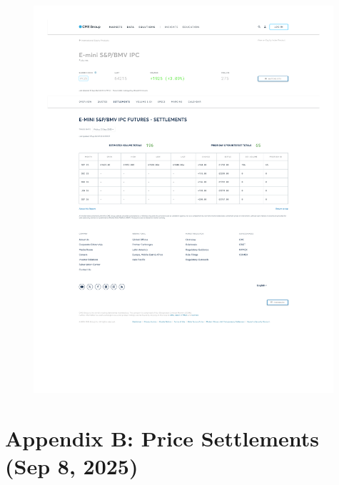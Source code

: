 \documentclass[10pt,a4paper]{article} %
\let\oldsection\section
\renewcommand{\section}{%
    \clearpage
    \thispagestyle{myfancy}%
    \oldsection
  }
\begin{document}
\begin{figure}[h]
  \centering
  \includegraphics[width=0.99\textwidth]{appendix/IPC12SEP.pdf}
  \label{fig:ipc_settlements}
\end{figure}

\section{Appendix B: Price Settlements (Sep 8, 2025)}
\newpage

\end{document}
